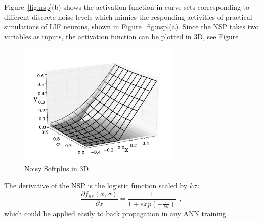 	Figure~\ref{fig:nsp}(b) shows the activation function in curve sets corresponding to different discrete noise levels which mimics the responding activities of practical simulations of LIF neurons, shown in Figure~\ref{fig:nsp}(a).
	Since the NSP takes two variables as inputs, the activation function can be plotted in 3D, see Figure\DIFaddbegin {}\DIFaddend 

	\begin{figure}[bt]
		\centering
		\includegraphics[width=0.7\textwidth]{pics_iconip/5.pdf}
		\caption{Noisy Softplus in 3D.}
		\label{Fig:NSP3D}
	\end{figure}

	The derivative of the NSP is the logistic function scaled by $k\sigma$:
	\begin{equation}
	\frac{\partial f_{ns}(x,\sigma)}{\partial x} = \frac{1}{1+exp(-\frac{x}{k\sigma})}~~,
	\label{equ:logist}
	\end{equation}	
	which could be applied easily to back propagation in any ANN training.	

	
